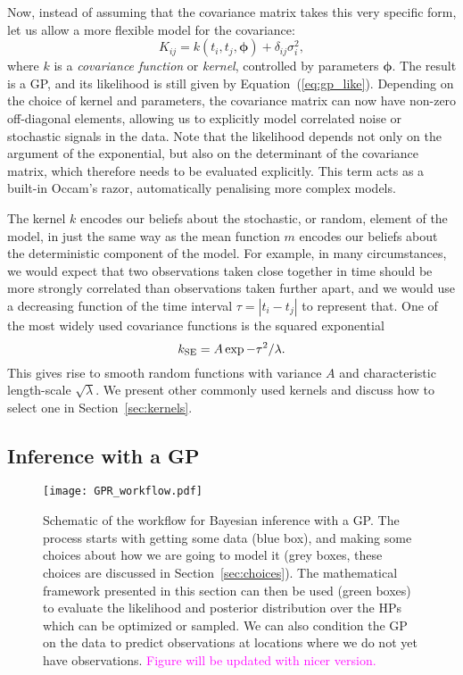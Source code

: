 \documentclass[letterpaper]{ar-1col}
\newcommand{\suz}[1]{\textcolor{magenta}{#1}}
\newcommand{\boldsymbol}[1]{\mathbf{#1}}
\begin{document}
Now, instead of assuming that the covariance matrix takes this very specific form, let us allow a more flexible model for the covariance:
\begin{equation}
  K_{ij} = k(t_i,t_j,\boldsymbol{\phi}) + \delta_{ij} \sigma_i^2,
\end{equation}
where $k$ is a \emph{covariance function} or \emph{kernel}, controlled by parameters $\boldsymbol{\phi}$. The result is a GP, and its likelihood is still given by Equation~(\ref{eq:gp_like}). Depending on the choice of kernel and parameters, the covariance matrix can now have non-zero off-diagonal elements, allowing us to explicitly model correlated noise or stochastic signals in the data. 
Note that the likelihood depends not only on the argument of the exponential, but also on the determinant of the covariance matrix, which therefore needs to be evaluated explicitly. This term acts as a built-in Occam's razor, automatically penalising more complex models.

The kernel $k$ encodes our beliefs about the stochastic, or random, element of the model, in just the same way as the mean function $m$ encodes our beliefs about the deterministic component of the model. For example, in many circumstances, we would expect that two observations taken close together in time should be more strongly correlated than observations taken further apart, and we would use a decreasing function of the time interval $\tau=|t_i-t_j|$ to represent that. One of the most widely used covariance functions is the squared exponential 
\begin{equation}
    k_{\rm SE} = A \exp{-\tau^2/\lambda}.
\end{equation}
This gives rise to smooth random functions with variance $A$ and characteristic length-scale $\sqrt{\lambda}$. We present other commonly used kernels and discuss how to select one in Section~\ref{sec:kernels}.

\subsection{Inference with a GP}

\begin{figure}[h]
  \texttt{[image: GPR\_workflow.pdf]}
  \caption{Schematic of the workflow for Bayesian inference with a GP. The process starts with getting some data (blue box), and making some choices about how we are going to model it (grey boxes, these choices are discussed in Section~\ref{sec:choices}). The mathematical framework presented in this section can then be used (green boxes) to evaluate the likelihood and posterior distribution over the HPs which can be optimized or sampled. We can also condition the GP on the data to predict observations at locations where we do not yet have observations. \suz{Figure will be updated with nicer version.}}
  \label{fig:GPRworkflow}
\end{figure}
\end{document}
